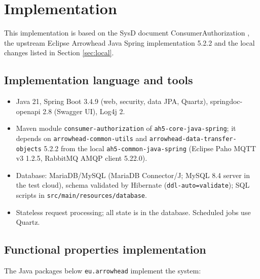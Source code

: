 \documentclass[a4paper]{arrowhead}
\begin{document}
\newpage

\section{Implementation}
\label{Implementation}

This implementation is based on the SysD document ConsumerAuthorization \cite{ca-sysd}, the upstream Eclipse Arrowhead Java Spring implementation 5.2.2 \cite{ah5java} and the local changes listed in Section \ref{sec:local}.

\subsection{Implementation language and tools}
\begin{itemize}
\item Java 21, Spring Boot 3.4.9 (web, security, data JPA, Quartz), springdoc-openapi 2.8 (Swagger UI), Log4j 2.
\item Maven module \texttt{consumer-authorization} of \texttt{ah5-core-java-spring}; it depends on \texttt{arrowhead-common-utils} and \texttt{arrowhead-data-transfer-objects} 5.2.2 from the local \texttt{ah5-common-java-spring} (Eclipse Paho MQTT v3 1.2.5, RabbitMQ AMQP client 5.22.0).
\item Database: MariaDB/MySQL (MariaDB Connector/J; MySQL 8.4 server in the test cloud), schema validated by Hibernate (\texttt{ddl-auto=validate}); SQL scripts in \texttt{src/main/resources/database}.
\item Stateless request processing; all state is in the database. Scheduled jobs use Quartz.
\end{itemize}

\subsection{Functional properties implementation}

The Java packages below \texttt{eu.arrowhead} implement the system:
\end{document}
